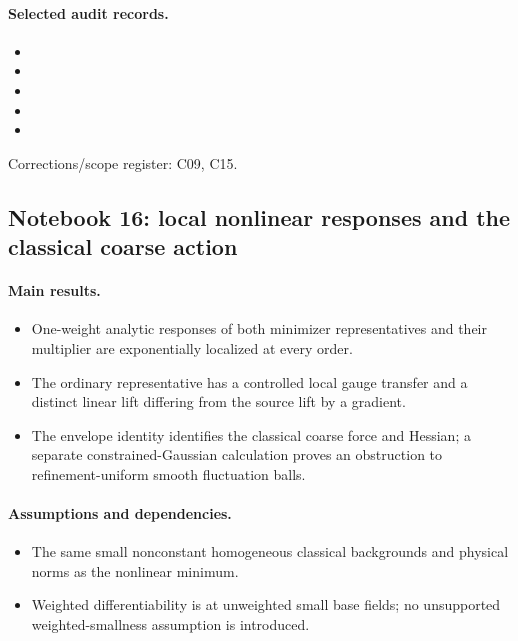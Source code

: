 \paragraph{Selected audit records.}
\begingroup\small
\begin{itemize}
\item {}
\item {}
\item {}
\item {}
\item {}
\end{itemize}
\endgroup
Corrections/scope register: C09, C15.\par

\subsection{Notebook 16: local nonlinear responses and the classical coarse action}
\label{hnc-16}
\noindent{}\par

\paragraph{Main results.}
\begin{itemize}
\item One-weight analytic responses of both minimizer representatives and their multiplier are exponentially localized at every order.
\item The ordinary representative has a controlled local gauge transfer and a distinct linear lift differing from the source lift by a gradient.
\item The envelope identity identifies the classical coarse force and Hessian; a separate constrained-Gaussian calculation proves an obstruction to refinement-uniform smooth fluctuation balls.
\end{itemize}

\paragraph{Assumptions and dependencies.}
\begin{itemize}
\item The same small nonconstant homogeneous classical backgrounds and physical norms as the nonlinear minimum.
\item Weighted differentiability is at unweighted small base fields; no unsupported weighted-smallness assumption is introduced.
\end{itemize}

